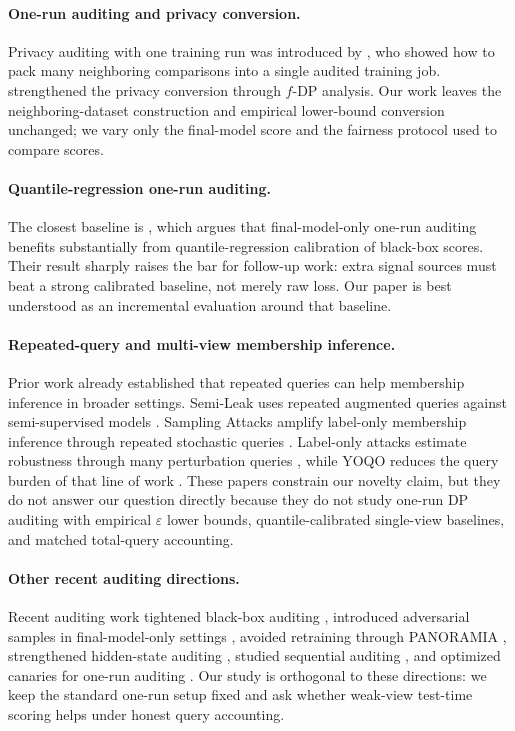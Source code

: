 \documentclass{article}
\newcommand{\eps}{\varepsilon}
\begin{document}
\paragraph{One-run auditing and privacy conversion.}
Privacy auditing with one training run was introduced by \citet{steinke2023privacy}, who showed how to pack many neighboring comparisons into a single audited training job. \citet{mahloujifar2024auditing} strengthened the privacy conversion through \(f\)-DP analysis. Our work leaves the neighboring-dataset construction and empirical lower-bound conversion unchanged; we vary only the final-model score and the fairness protocol used to compare scores.

\paragraph{Quantile-regression one-run auditing.}
The closest baseline is \citet{liu2025enhancing}, which argues that final-model-only one-run auditing benefits substantially from quantile-regression calibration of black-box scores. Their result sharply raises the bar for follow-up work: extra signal sources must beat a strong calibrated baseline, not merely raw loss. Our paper is best understood as an incremental evaluation around that baseline.

\paragraph{Repeated-query and multi-view membership inference.}
Prior work already established that repeated queries can help membership inference in broader settings. Semi-Leak uses repeated augmented queries against semi-supervised models \citep{he2022semileak}. Sampling Attacks amplify label-only membership inference through repeated stochastic queries \citep{rahimian2020sampling}. Label-only attacks estimate robustness through many perturbation queries \citep{choquettechoo2021labelonly}, while YOQO reduces the query burden of that line of work \citep{wu2024yoqo}. These papers constrain our novelty claim, but they do not answer our question directly because they do not study one-run DP auditing with empirical \(\eps\) lower bounds, quantile-calibrated single-view baselines, and matched total-query accounting.

\paragraph{Other recent auditing directions.}
Recent auditing work tightened black-box auditing \citep{annamalai2024nearly}, introduced adversarial samples in final-model-only settings \citep{yoon2024adversarial}, avoided retraining through PANORAMIA \citep{kazmi2024panoramia}, strengthened hidden-state auditing \citep{cebere2025tighter}, studied sequential auditing \citep{gonzalez2025sequentially}, and optimized canaries for one-run auditing \citep{wang2026optimizing}. Our study is orthogonal to these directions: we keep the standard one-run setup fixed and ask whether weak-view test-time scoring helps under honest query accounting.
\end{document}
